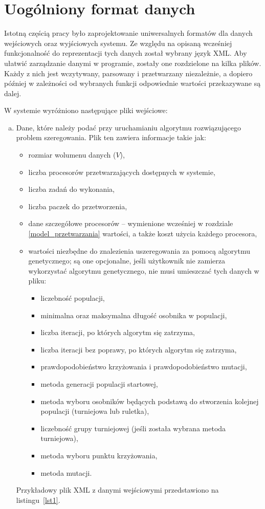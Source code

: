 \section{Uogólniony format danych}\label{pliki}

Istotną częścią pracy było zaprojektowanie uniwersalnych formatów dla danych wejściowych oraz wyjściowych systemu. Ze względu na opisaną wcześniej 
funkcjonalność do reprezentacji tych danych został wybrany język XML. Aby ułatwić zarządzanie danymi w programie, zostały one rozdzielone na kilka 
plików. Każdy z nich jest wczytywany, parsowany i przetwarzany niezależnie, a dopiero później w zależności od wybranych funkcji odpowiednie 
wartości przekazywane są dalej.

W systemie wyróżniono następujące pliki wejściowe:
\begin{enumerate}[a)]
	\item Dane, które należy podać przy uruchamianiu algorytmu rozwiązującego problem szeregowania. Plik ten zawiera informacje takie jak:
	\begin{itemize}
		\item rozmiar wolumenu danych ($V$),
		\item liczba procesorów przetwarzających dostępnych w systemie,
		\item liczba zadań do wykonania,
		\item liczba paczek do przetworzenia,
		\item dane szczegółowe procesorów -- wymienione wcześniej w rozdziale \vref{model_przetwarzania} 
		wartości, a także koszt użycia każdego procesora,
		\item wartości niezbędne do znalezienia uszeregowania za pomocą algorytmu genetycznego; są one opcjonalne, jeśli użytkownik 
		nie zamierza wykorzystać algorytmu genetycznego, nie musi umieszczać tych danych w pliku:
		\begin{itemize}
			\item liczebność populacji,
			\item minimalna oraz maksymalna długość osobnika w populacji,
			\item liczba iteracji, po których algorytm się zatrzyma,
			\item liczba iteracji bez poprawy, po których algorytm się zatrzyma,
			\item prawdopodobieństwo krzyżowania i prawdopodobieństwo mutacji,
			\item metoda generacji populacji startowej,
			\item metoda wyboru osobników będących podstawą do stworzenia kolejnej populacji (turniejowa lub ruletka),
			\item liczebność grupy turniejowej (jeśli została wybrana metoda turniejowa),
			\item metoda wyboru punktu krzyżowania,
			\item metoda mutacji.
		\end{itemize}
	\end{itemize}
Przykładowy plik XML z danymi wejściowymi przedstawiono na listingu~\vref{lst1}.


\end{enumerate}
